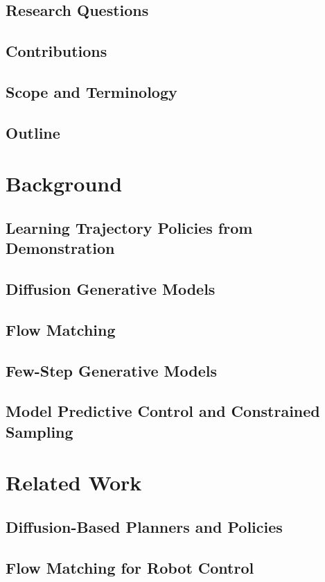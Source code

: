 \documentclass[headsepline,footsepline,footinclude=false,oneside,fontsize=11pt,paper=a4,listof=totoc,bibliography=totoc]{scrbook}
\begin{document}
\section{Research Questions}
\section{Contributions}
\section{Scope and Terminology}
\section{Outline}

\chapter{Background}\label{ch:background}
\section{Learning Trajectory Policies from Demonstration}
\section{Diffusion Generative Models}
\section{Flow Matching}
\section{Few-Step Generative Models}
\section{Model Predictive Control and Constrained Sampling}

\chapter{Related Work}\label{ch:related}
\section{Diffusion-Based Planners and Policies}
\section{Flow Matching for Robot Control}
\end{document}
